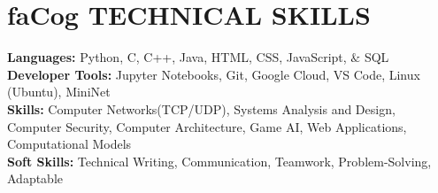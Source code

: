 \documentclass[a4paper,11pt]{article}
\newcommand{\seticon}[1]{\textcolor{Cerulean}{\csname #1\endcsname}}
\begin{document}
\section{\seticon{faCog} \textbf{TECHNICAL SKILLS}} %
\begin{itemize}[leftmargin=0.15in, label={}]
    \small{\item{
     \textbf{Languages:}{ Python, C, C++, Java, HTML, CSS, JavaScript, $\&$ SQL} \\		   
    \textbf{Developer Tools:}{ Jupyter Notebooks, Git, Google Cloud, VS Code, Linux (Ubuntu), MiniNet}\\
    \textbf{Skills:}{ Computer Networks(TCP/UDP), Systems Analysis and Design, Computer Security, Computer Architecture, Game AI, Web Applications, Computational Models}\\ 
    \textbf{Soft Skills:}{ Technical Writing, Communication, Teamwork, Problem-Solving, Adaptable}\\
    }}
 \end{itemize} \vspace{-13pt}
\end{document}
